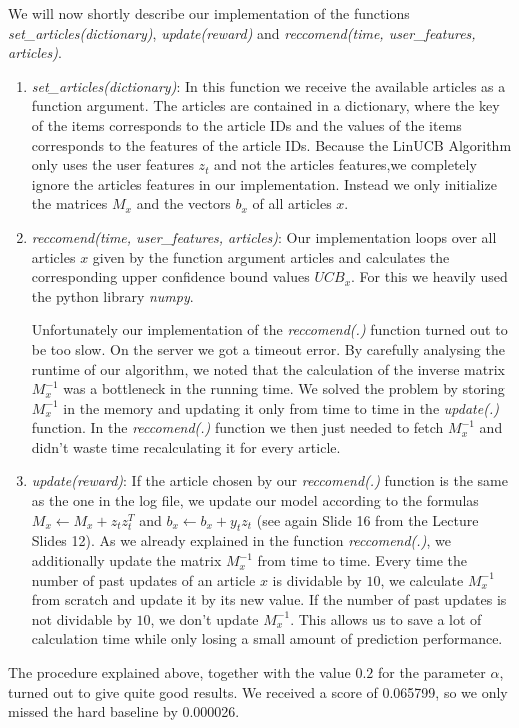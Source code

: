 \documentclass[a4paper, 11pt]{article}
\begin{document}
We will now shortly describe our implementation of the functions \emph{set\_articles(dictionary)}, \emph{update(reward)} and \emph{reccomend(time, user\_features, articles)}.
\begin{enumerate}
\item{\emph{set\_articles(dictionary)}:} In this function we receive the available articles as a function argument. The articles are contained in a dictionary, where the key of the items corresponds to the article IDs and the values of the items corresponds to the features of the article IDs. Because the LinUCB Algorithm only uses the user features $z_t$ and not the articles features,we completely ignore the articles features in our implementation. Instead we only initialize the matrices $M_x$ and the vectors $b_x$ of all articles $x$.

\item{\emph{reccomend(time, user\_features, articles)}:} Our implementation loops over all articles $x$ given by the function argument articles and calculates the corresponding upper confidence bound values $UCB_x$. For this we heavily used the python library \emph{numpy}.

Unfortunately our implementation of the \emph{reccomend(.)} function turned out to be too slow. On the server we got a timeout error. By carefully analysing the runtime of our algorithm, we noted that the calculation of the inverse matrix $M_x^{-1}$ was a bottleneck in the running time. We solved the problem by storing $M_x^{-1}$ in the memory and updating it only from time to time in the \emph{update(.)} function. In the \emph{reccomend(.)} function we then just needed to fetch $M_x^{-1}$ and didn't waste time recalculating it for every article.

\item{\emph{update(reward)}:} If the article chosen by our \emph{reccomend(.)} function is the same as the one in the log file, we update our model according to the formulas $M_x \leftarrow M_x + z_tz_t^T$ and $b_x \leftarrow b_x + y_tz_t$ (see again Slide 16 from the Lecture Slides 12). As we already explained in the function \emph{reccomend(.)}, we additionally update the matrix $M_x^{-1}$ from time to time. Every time the number of past updates of an article $x$ is dividable by $10$, we calculate $M_x^{-1}$ from scratch and update it by its new value. If the number of past updates is not dividable by $10$, we don't update $M_x^{-1}$. This allows us to save a lot of calculation time while only losing a small amount of prediction performance.
\end{enumerate}

The procedure explained above, together with the value $0.2$ for the parameter $\alpha$, turned out to give quite good results. We received a score of 0.065799, so we only missed the hard baseline by 0.000026.
\end{document}
